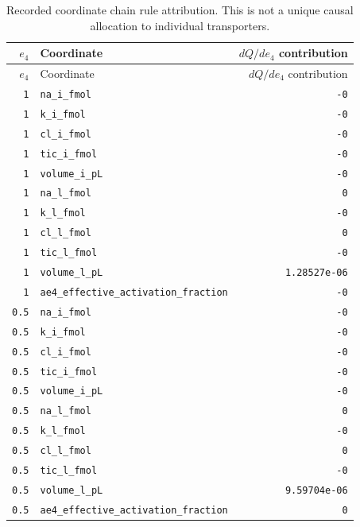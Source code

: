 \begingroup\footnotesize
\setlength{\tabcolsep}{3pt}
\begin{longtable}{rlr}
\caption{Recorded coordinate chain rule attribution. This is not a unique causal allocation to individual transporters.}\\
\toprule
$e_4$ & Coordinate & $dQ/de_4$ contribution \\
\midrule\endfirsthead
\toprule
$e_4$ & Coordinate & $dQ/de_4$ contribution \\
\midrule\endhead
\bottomrule\endfoot
\texttt{1} & \nolinkurl{na_i_fmol} & \texttt{-0} \\
\texttt{1} & \nolinkurl{k_i_fmol} & \texttt{-0} \\
\texttt{1} & \nolinkurl{cl_i_fmol} & \texttt{-0} \\
\texttt{1} & \nolinkurl{tic_i_fmol} & \texttt{-0} \\
\texttt{1} & \nolinkurl{volume_i_pL} & \texttt{-0} \\
\texttt{1} & \nolinkurl{na_l_fmol} & \texttt{0} \\
\texttt{1} & \nolinkurl{k_l_fmol} & \texttt{-0} \\
\texttt{1} & \nolinkurl{cl_l_fmol} & \texttt{0} \\
\texttt{1} & \nolinkurl{tic_l_fmol} & \texttt{-0} \\
\texttt{1} & \nolinkurl{volume_l_pL} & \texttt{1.28527e-06} \\
\texttt{1} & \nolinkurl{ae4_effective_activation_fraction} & \texttt{-0} \\
\texttt{0.5} & \nolinkurl{na_i_fmol} & \texttt{-0} \\
\texttt{0.5} & \nolinkurl{k_i_fmol} & \texttt{-0} \\
\texttt{0.5} & \nolinkurl{cl_i_fmol} & \texttt{-0} \\
\texttt{0.5} & \nolinkurl{tic_i_fmol} & \texttt{-0} \\
\texttt{0.5} & \nolinkurl{volume_i_pL} & \texttt{-0} \\
\texttt{0.5} & \nolinkurl{na_l_fmol} & \texttt{0} \\
\texttt{0.5} & \nolinkurl{k_l_fmol} & \texttt{-0} \\
\texttt{0.5} & \nolinkurl{cl_l_fmol} & \texttt{0} \\
\texttt{0.5} & \nolinkurl{tic_l_fmol} & \texttt{-0} \\
\texttt{0.5} & \nolinkurl{volume_l_pL} & \texttt{9.59704e-06} \\
\texttt{0.5} & \nolinkurl{ae4_effective_activation_fraction} & \texttt{0} \\

\end{longtable}

